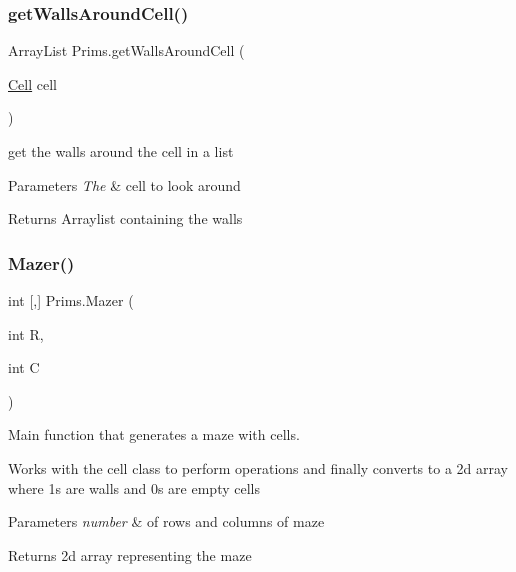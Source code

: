 \subsubsection{\texorpdfstring{getWallsAroundCell()}{getWallsAroundCell()}}
{\footnotesize\ttfamily Array\+List Prims.\+get\+Walls\+Around\+Cell (\begin{DoxyParamCaption}\item[{\mbox{\hyperlink{class_cell}{Cell}}}]{cell }\end{DoxyParamCaption})\hspace{0.3cm}{\ttfamily [private]}}



get the walls around the cell in a list 


\begin{DoxyParams}{Parameters}
{\em The} & cell to look around\\
\hline
\end{DoxyParams}
\begin{DoxyReturn}{Returns}
Arraylist containing the walls 
\end{DoxyReturn}
\mbox{\label{class_prims_a91fe81277dd1390c13955bd5f338cd86}} 
\subsubsection{\texorpdfstring{Mazer()}{Mazer()}}
{\footnotesize\ttfamily int \mbox{[},\mbox{]} Prims.\+Mazer (\begin{DoxyParamCaption}\item[{int}]{R,  }\item[{int}]{C }\end{DoxyParamCaption})}



Main function that generates a maze with cells. 

Works with the cell class to perform operations and finally converts to a 2d array where 1s are walls and 0s are empty cells


\begin{DoxyParams}{Parameters}
{\em number} & of rows and columns of maze\\
\hline
\end{DoxyParams}
\begin{DoxyReturn}{Returns}
2d array representing the maze 
\end{DoxyReturn}
\mbox{\label{class_prims_a72d5c6fce801461c3dc9a6a9e4f117f3}} 
